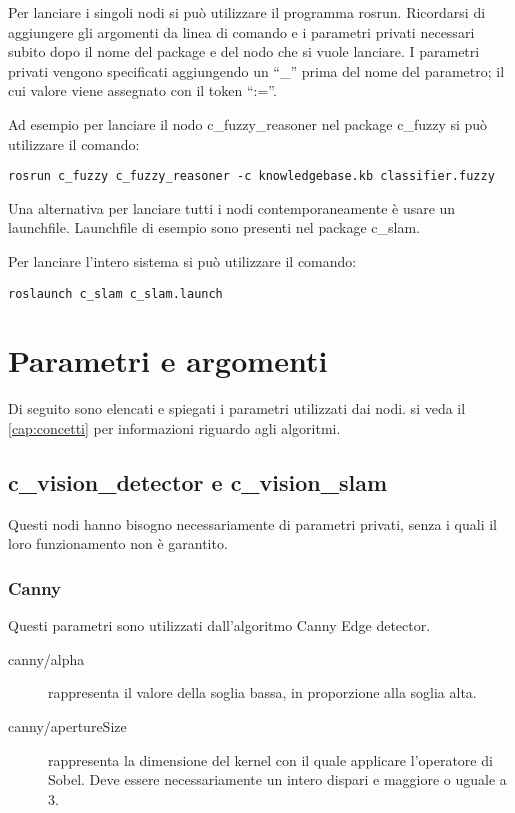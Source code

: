 Per lanciare i singoli nodi si può utilizzare il programma rosrun. Ricordarsi di aggiungere gli argomenti da linea di comando e i parametri privati necessari subito dopo il nome del package e del nodo che si vuole lanciare. 
I parametri privati vengono specificati aggiungendo un ``\_'' prima del nome del parametro; il cui valore viene assegnato con il token ``:=''.

Ad esempio per lanciare il nodo c\_fuzzy\_reasoner nel package c\_fuzzy si può utilizzare il comando:

\begin{verbatim}
rosrun c_fuzzy c_fuzzy_reasoner -c knowledgebase.kb classifier.fuzzy
\end{verbatim}

Una alternativa per lanciare tutti i nodi contemporaneamente è usare un launchfile. Launchfile di esempio sono presenti nel package c\_slam.

Per lanciare l'intero sistema si può utilizzare il comando:

\begin{verbatim}
roslaunch c_slam c_slam.launch
\end{verbatim}


\section{Parametri e argomenti}

Di seguito sono elencati e spiegati i parametri utilizzati dai nodi. si veda il \autoref{cap:concetti} per informazioni riguardo agli algoritmi.

\subsection{c\_vision\_detector e c\_vision\_slam}

Questi nodi hanno bisogno necessariamente di parametri privati, senza i quali il loro funzionamento non è garantito.

\subsubsection{Canny}

Questi parametri sono utilizzati dall'algoritmo Canny Edge detector.

\begin{description}
 \item [canny/alpha] rappresenta il valore della soglia bassa, in proporzione alla soglia alta.
 \item [canny/apertureSize] rappresenta la dimensione del kernel con il quale applicare l'operatore di Sobel. Deve essere necessariamente un intero dispari e maggiore o uguale a 3. 
\end{description}

